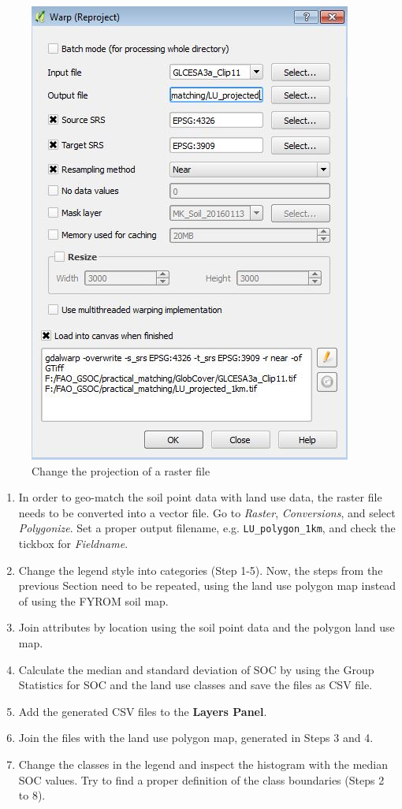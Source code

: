 \documentclass[10pt,b5paper,]{book}
\providecommand{\tightlist}{%
  \setlength{\itemsep}{0pt}\setlength{\parskip}{0pt}}
\theoremstyle{definition}
\theoremstyle{definition}
\theoremstyle{definition}
\theoremstyle{remark}
\begin{document}
\begin{figure}

{\centering \includegraphics[width=0.8\linewidth]{images/Conv_upscaling9} 

}

\caption{Change the projection of a raster file}\label{fig:changeproj}
\end{figure}

\begin{enumerate}
\def\labelenumi{\arabic{enumi}.}
\setcounter{enumi}{3}
\tightlist
\item
  In order to geo-match the soil point data with land use data, the
  raster file needs to be converted into a vector file. Go to
  \emph{Raster}, \emph{Conversions}, and select \emph{Polygonize}. Set a
  proper output filename, e.g. \texttt{LU\_polygon\_1km}, and check the
  tickbox for \emph{Fieldname}.
\item
  Change the legend style into categories (Step 1-5). Now, the steps
  from the previous Section need to be repeated, using the land use
  polygon map instead of using the FYROM soil map.
\item
  Join attributes by location using the soil point data and the polygon
  land use map.
\item
  Calculate the median and standard deviation of SOC by using the Group
  Statistics for SOC and the land use classes and save the files as CSV
  file.
\item
  Add the generated CSV files to the \textbf{Layers Panel}.
\item
  Join the files with the land use polygon map, generated in Steps 3 and
  4.
\item
  Change the classes in the legend and inspect the histogram with the
  median SOC values. Try to find a proper definition of the class
  boundaries (Steps 2 to 8).
\end{enumerate}
\end{document}
